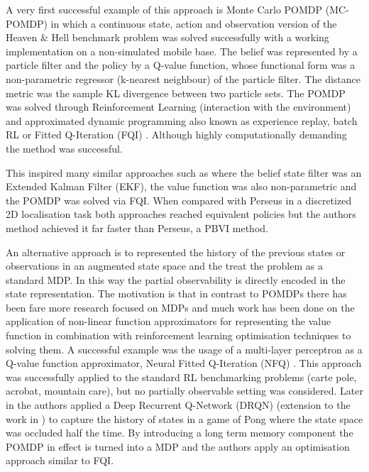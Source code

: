 A very first successful example of this approach is Monte Carlo POMDP (MC-POMDP) \cite{MC-POMDP} in which a continuous 
state, action and observation version of the Heaven \& Hell benchmark problem was solved successfully with a working 
implementation on a non-simulated mobile base.  
The belief was represented by a particle filter and the policy by a Q-value function, whose functional form was 
a non-parametric regressor (k-nearest neighbour) of the particle filter. The distance metric was the sample KL divergence
between two particle sets. The POMDP was solved through Reinforcement Learning (interaction with the environment) and 
approximated dynamic programming also known as experience replay, batch RL or Fitted Q-Iteration (FQI) \cite{Tree_batch_2005}. 
Although highly computationally demanding the method was successful. 

This inspired many similar approaches such as \cite{mc_update_ppomdps} where the belief state filter was an 
Extended Kalman Filter (EKF), the value function was also non-parametric and the POMDP was solved via FQI. 
When compared with Perseus in a discretized 2D localisation task both approaches reached equivalent 
policies but the authors method achieved it far faster than Perseus, a PBVI method. 

An alternative approach is to represented the history of the previous states or observations in an augmented state space and the treat the problem 
as a standard MDP. In this way the partial observability is directly encoded in the state representation. The motivation is that in contrast to 
POMDPs there has been fare more research focused on MDPs and much work has been done on the application of non-linear function 
approximators for representing the value function in combination with reinforcement learning optimisation techniques to solving them.
A successful example was the usage of a multi-layer perceptron as a Q-value function approximator, Neural Fitted Q-Iteration (NFQ) \cite{neura_fqi_2005}.
This approach was successfully applied to the standard RL benchmarking problems (carte pole, acrobat, mountain care), but no partially observable
setting was considered. Later in \cite{DRQ_AAAI_2015} the authors applied a Deep Recurrent Q-Network (DRQN) (extension to the work in \cite{mnih-dqn-2015}) to capture the history of states 
in a game of Pong where the state space was occluded half the time. By introducing a long term memory component the POMDP in effect is turned into a MDP and the authors apply an optimisation approach similar to FQI. 

